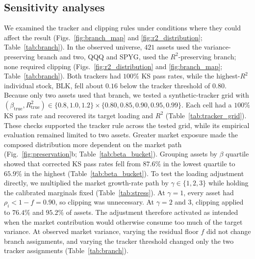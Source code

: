 
\subsection{Sensitivity analyses}

We examined the tracker and clipping rules under conditions where
they could affect the result (Figs.~\ref{fig:branch_map} and
\ref{fig:r2_distribution}; Table~\ref{tab:branch}). In the observed universe, $421$ assets
used the variance-preserving branch and two, QQQ and SPYG, used the
$R^2$-preserving branch; none required clipping
(Figs.~\ref{fig:r2_distribution} and \ref{fig:branch_map};
Table~\ref{tab:branch}). Both trackers had $100\%$ KS pass rates,
while the highest-$R^2$ individual stock, BLK, fell about $0.16$
below the tracker threshold of $0.80$. Because only two assets used
that branch, we tested a synthetic-tracker grid with
$(\beta_{\mathrm{true}},R^2_{\mathrm{true}})\in\{0.8,1.0,1.2\}
\times\{0.80,0.85,0.90,0.95,0.99\}$. Each cell had a $100\%$ KS pass
rate and recovered its target loading and $R^2$
(Table~\ref{tab:tracker_grid}). These checks supported the tracker
rule across the tested grid, while its empirical evaluation remained
limited to two assets.
Greater market exposure made the composed distribution more dependent
on the market path (Fig.~\ref{fig:preservation}b;
Table~\ref{tab:beta_bucket}). Grouping assets by $\beta$ quartile showed that
corrected KS pass rates fell from $87.6\%$ in the lowest quartile
to $65.9\%$ in the highest (Table~\ref{tab:beta_bucket}).
To test the loading adjustment directly, we multiplied the market
growth-rate path by $\gamma\in\{1,2,3\}$ while holding the calibrated
marginals fixed (Table~\ref{tab:stress}). At $\gamma=1$, every
asset had $\rho_i<1-f=0.90$, so clipping was unnecessary.
At $\gamma=2$ and $3$, clipping applied to $76.4\%$ and $95.2\%$
of assets. The adjustment therefore activated as intended when the
market contribution would otherwise consume too much of the target
variance. At observed market variance, varying the residual floor
$f$ did not change branch assignments, and varying the tracker
threshold changed only the two tracker assignments
(Table~\ref{tab:branch}).
